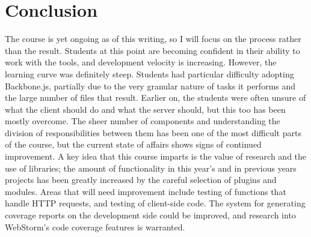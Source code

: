 \documentclass[12pt]{article}
\begin{document}
\section{Conclusion}\label{sec:conclusion}
The course is yet ongoing as of this writing, so I will focus on the process rather than the result. 
Students at this point are becoming confident in their ability to work with the tools, and development velocity is increasing. 
However, the learning curve was definitely steep. Students had particular difficulty adopting Backbone.js, partially due to the very granular nature of tasks it performs and the large number of files that result. 
Earlier on, the students were often unsure of what the client should do and what the server should, but this too has been mostly overcome. 
The sheer number of components and understanding the division of responsibilities between them has been one of the most  difficult parts of the course, but the current state of affairs shows signs of continued improvement. 
A key idea that this course imparts is the value of research and the use of libraries; the amount of functionality in this year's and in previous years projects has been greatly increased by the careful selection of plugins and modules. 
Areas that will need improvement include testing of functions that handle HTTP requests, and testing of client-side code. 
The system for generating coverage reports on the development side could be improved, and research into WebStorm's code coverage features is warranted.


%
%




%  
%
%


\end{document}
